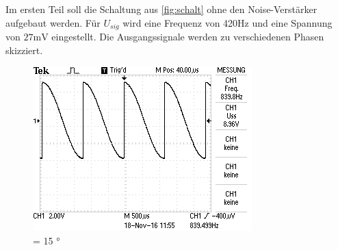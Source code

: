 Im ersten Teil soll die Schaltung aus \ref{fig:schalt} ohne den Noise-Verstärker
aufgebaut werden. Für $U_{sig}$ wird eine Frequenz von 420$\si{\hertz}$ und eine
Spannung von $27\si{\milli\volt}$ eingestellt. Die Ausgangssignale werden zu
verschiedenen Phasen skizziert.
\begin{figure}
  \includegraphics{Bilder/15.jpeg}
  \caption{\Phi = 15 °}
  \label{fig:15}
\end{figure}
